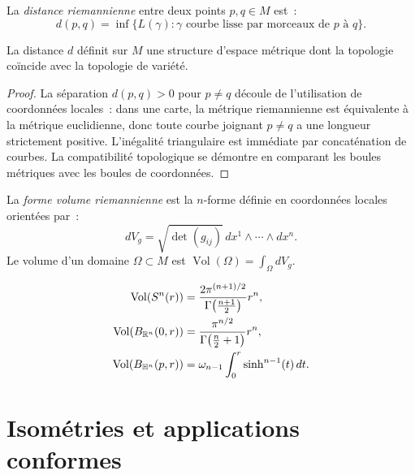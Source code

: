 \begin{definition}
La \emph{distance riemannienne} entre deux points $p, q \in M$ est~:
\[
    d(p,q) = \inf \{ L(\gamma) : \gamma \text{ courbe lisse par morceaux de } p \text{ \`a } q \}.
\]
\end{definition}

\begin{theoreme}
La distance $d$ d\'efinit sur $M$ une structure d'espace m\'etrique dont la topologie
co\"incide avec la topologie de vari\'et\'e.
\end{theoreme}

\begin{proof}
La s\'eparation $d(p,q) > 0$ pour $p \neq q$ d\'ecoule de l'utilisation de
coordonn\'ees locales~: dans une carte, la m\'etrique riemannienne est \'equivalente
\`a la m\'etrique euclidienne, donc toute courbe joignant $p \neq q$ a une longueur
strictement positive. L'in\'egalit\'e triangulaire est imm\'ediate par concat\'enation
de courbes. La compatibilit\'e topologique se d\'emontre en comparant les boules
m\'etriques avec les boules de coordonn\'ees.
\end{proof}

\begin{definition}
La \emph{forme volume riemannienne} est la $n$-forme d\'efinie en coordonn\'ees
locales orient\'ees par~:
\[
    dV_g = \sqrt{\det(g_{ij})} \, dx^1 \wedge \cdots \wedge dx^n.
\]
Le volume d'un domaine $\Omega \subset M$ est $\operatorname{Vol}(\Omega) = \int_\Omega dV_g$.
\end{definition}

\begin{formules}[title=\textbf{Formules de volume des espaces mod\`eles}]
\begin{align*}
    \operatorname{Vol}(S^n(r)) &= \frac{2\pi^{(n+1)/2}}{\Gamma\!\left(\frac{n+1}{2}\right)} r^n, \\
    \operatorname{Vol}(B_{\mathbb{R}^n}(0,r)) &= \frac{\pi^{n/2}}{\Gamma\!\left(\frac{n}{2}+1\right)} r^n, \\
    \operatorname{Vol}(B_{\mathbb{H}^n}(p,r)) &= \omega_{n-1} \int_0^r \sinh^{n-1}(t)\, dt.
\end{align*}
\end{formules}

\section{Isom\'etries et applications conformes}

